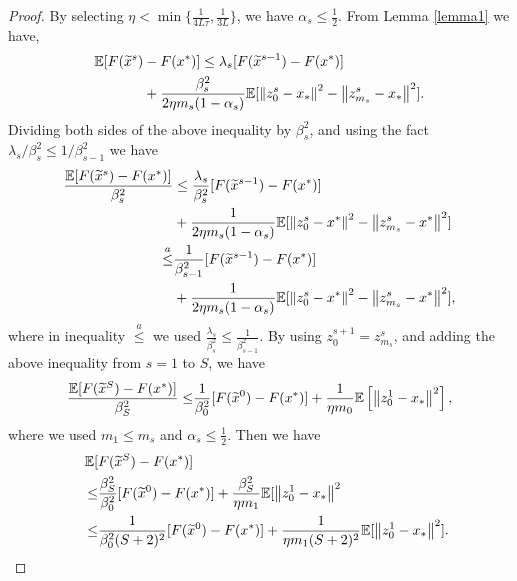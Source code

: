 \begin{proof}
By selecting $\eta < \min\{\frac{1}{4L
\tau}, \frac{1}{3L}\}$, we have $\alpha_s\leq \frac{1}{2}$. From Lemma \ref{lemma1} we have,
\begin{equation}
\begin{split}
\mathbb{E}[F(\widetilde{x}^s)&-F(x^*)]\leq  \lambda_s[F({\widetilde x}^{s-1})-F(x^*)]\\ 
&+ {\frac{\beta_s^2}{2\eta m_s(1-\alpha_s)}}\mathbb{E}[\left\lVert z_{0}^s-x_*\right\rVert^2-\left\lVert z_{m_s}^s-x_*\right\rVert^2].
\end{split}
\end{equation}
Dividing both sides of the above inequality by $\beta_s^2$, and using the fact $\lambda_s/\beta_s^2 \leq 1/\beta_{s-1}^2$ we have
\begin{equation*}
\begin{split}
\frac{\mathbb{E}[F(\widetilde{x}^s)-F(x^*)]}{\beta_s^2}&\leq  \frac{\lambda_s}{\beta_s^2}[F(\widetilde{x}^{s-1})-F(x^*)]\\ 
& + {\frac{1 }{2\eta m_s(1-\alpha_s)}}\mathbb{E}[\left\lVert z_{0}^s-x^*\right\rVert^2-\left\lVert z_{m_s}^s-x^*\right\rVert^2]\\
\stackrel{a}{\leq} & \frac{1}{\beta_{s-1}^2}[F(\widetilde{x}^{s-1})-F(x^*)] \\
&+ {\frac{1}{2\eta m_s(1-\alpha_s)}}\mathbb{E}[\left\lVert z_{0}^s-x^*\right\rVert^2-\left\lVert z_{m_s}^s-x^*\right\rVert^2], 
\end{split}
\end{equation*}
where in inequality $\stackrel{a}{\leq}$ we used $\frac{\lambda_s}{\beta_s^2}\leq \frac{1}{\beta_{s-1}^2}$. By using $z_0^{s+1} = z_{m_s}^s$, and adding the above inequality from $s=1$ to $S$, we have
\begin{equation*}
\begin{split}
\frac{\mathbb{E}[F(\widetilde{x}^S)-F(x^*)]}{\beta_S^2}\leq & \frac{1}{\beta_{0}^2}[F(\widetilde{x}^{0})-F(x^*)] + {\frac{1}{\eta m_0}}\mathbb{E}\left[\left\lVert z_{0}^1-x_*\right\rVert^2\right], \\
\end{split}
\end{equation*}
where we used $m_1\leq m_s$ and $\alpha_s\leq \frac{1}{2}$.
Then we have
\begin{equation*}
\begin{split}
~~~\mathbb{E}[& F(\widetilde{x}^S)-F(x^*)]\\
\leq & \frac{\beta_S^2}{\beta_{0}^2}[F(\widetilde{x}^{0})-F(x^*)]+ {\frac{ \beta_S^2}{\eta m_1}}\mathbb{E}[\left\lVert z_{0}^1-x_*\right\rVert^2\\
\leq & \frac{1}{\beta_{0}^2(S+2)^2}[F(\widetilde{x}^{0})-F(x^*)] + {\frac{1 }{\eta m_1(S+2)^2}}\mathbb{E}[\left\lVert z_{0}^1-x_*\right\rVert^2].
\end{split}
\end{equation*}


\end{proof}
